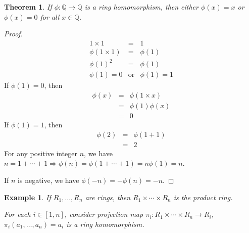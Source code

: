 \documentclass{article}
\theoremstyle{MyNonumberplain}
\theoremstyle{break}
\newtheorem*{proof}{Proof. }
\newcommand{\tmop}{\text}
\theoremstyle{break}
\newtheorem{theorem}{Theorem}[section]
\newtheorem{example}{Example}[section]
\theoremstyle{break}
\theoremstyle{definition}
\theoremstyle{break}
\begin{document}
\begin{thmbox}
    \begin{theorem}
        If $\phi : \mathbb{Q} \rightarrow \mathbb{Q}$ is a ring homomorphism, then
        either $\phi (x) = x$ or $\phi (x) = 0$ for all $x \in \mathbb{Q}$.
    \end{theorem}
    \begin{prfbox}
        \begin{proof}
            \begin{eqnarray*}
                1 \times 1 & = & 1\\
                \phi (1 \times 1) & = & \phi (1)\\
                \phi (1)^2 & = & \phi (1)\\
                \phi (1) = 0 & \tmop{or} & \phi (1) = 1
              \end{eqnarray*}
              If $\phi (1) = 0$, then
              \begin{eqnarray*}
                \phi (x) & = & \phi (1 \times x)\\
                & = & \phi (1) \phi (x)\\
                & = & 0
              \end{eqnarray*}
              If $\phi (1) = 1$, then
              \begin{eqnarray*}
                \phi (2) & = & \phi (1 + 1)\\
                & = & 2
              \end{eqnarray*}
              For any positive integer $n$, we have $n = 1 + \cdots + 1 \Rightarrow \phi (n)
              = \phi (1 + \cdots + 1) = n \phi (1) = n$.\bigskip
              
              If $n$ is negative, we have $\phi (- n) = - \phi (n) = - n$.
        \end{proof}
    \end{prfbox}
\end{thmbox}

\begin{expbox}
    \begin{example}
        If $R_1, \ldots, R_n$ are rings, then $R_1 \times \cdots \times R_n$ is the
        product ring.
        
        For each $i \in [1, n]$, consider projection map $\pi_i : R_1 \times \cdots
        \times R_n \rightarrow R_i$, $\pi_i (a_1, \ldots, a_n) = a_i$ is a ring
        homomorphism.
    \end{example}
\end{expbox}
\end{document}
